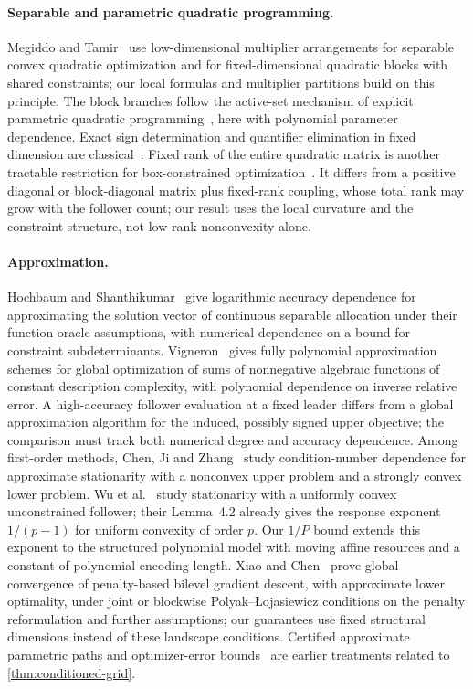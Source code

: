 \paragraph{Separable and parametric quadratic programming.}
Megiddo and Tamir~\cite{MegiddoTamir1993} use low-dimensional multiplier
arrangements for separable convex quadratic optimization and for
fixed-dimensional quadratic blocks with shared constraints; our local
formulas and multiplier partitions build on this principle. The block
branches follow the active-set mechanism of explicit parametric quadratic
programming~\cite{BemporadEtAl2002}, here with polynomial parameter
dependence. Exact sign determination and quantifier elimination in fixed
dimension are classical~\cite{BasuPollackRoy1996}. Fixed rank of the entire
quadratic matrix is another tractable restriction for box-constrained
optimization~\cite{HladikCernyRada2021}. It differs from a positive
diagonal or block-diagonal matrix plus fixed-rank coupling, whose total
rank may grow with the follower count; our result uses the local curvature
and the constraint structure, not low-rank nonconvexity alone.

\paragraph{Approximation.}
Hochbaum and Shanthikumar~\cite{HochbaumShanthikumar1990} give logarithmic
accuracy dependence for approximating the solution vector of continuous
separable allocation under their function-oracle assumptions, with
numerical dependence on a bound for constraint subdeterminants.
Vigneron~\cite{Vigneron2014} gives fully polynomial approximation schemes
for global optimization of sums of nonnegative algebraic functions of
constant description complexity, with polynomial dependence on inverse
relative error. A high-accuracy follower evaluation at a fixed leader
differs from a global approximation algorithm for the induced, possibly
signed upper objective; the comparison must track both numerical degree and
accuracy dependence. Among first-order methods, Chen, Ji and
Zhang~\cite{ChenJiZhang2026} study condition-number dependence for
approximate stationarity with a nonconvex upper problem and a strongly
convex lower problem. Wu et al.~\cite{WuEtAl2026} study stationarity with a
uniformly convex unconstrained follower; their Lemma~4.2 already gives the
response exponent $1/(p-1)$ for uniform convexity of order $p$. Our $1/P$
bound extends this exponent to the structured polynomial model with moving
affine resources and a constant of polynomial encoding length. Xiao and
Chen~\cite{XiaoChen2025} prove global convergence of penalty-based bilevel
gradient descent, with approximate lower optimality, under joint or
blockwise Polyak--\L{}ojasiewicz conditions on the penalty reformulation
and further assumptions; our guarantees use fixed structural dimensions instead of
these landscape conditions. Certified approximate parametric paths and
optimizer-error bounds~\cite{GiesenJaggiLaue2012,GiesenEtAl2012,BemporadFilippi2001}
are earlier treatments related to \cref{thm:conditioned-grid}.

